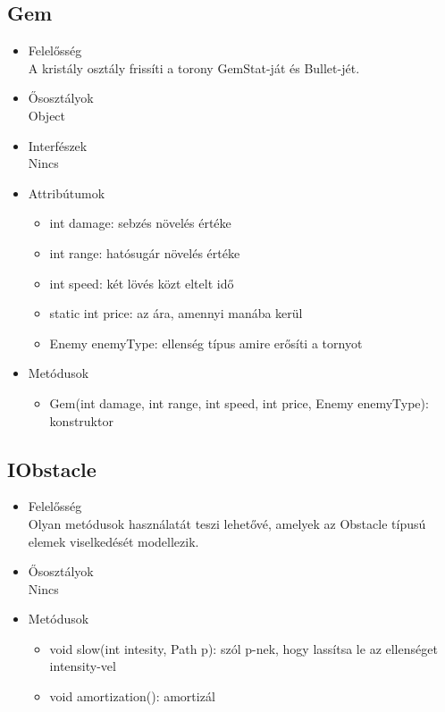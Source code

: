 \subsection{Gem}
\begin{itemize}
\item Felelősség\\
A kristály osztály frissíti a torony GemStat-ját és Bullet-jét.
\item Ősosztályok\\
Object
\item Interfészek\\
Nincs
\item Attribútumok\\
	\begin{itemize}
		\item int damage: sebzés növelés értéke
		\item int range: hatósugár növelés értéke
		\item int speed: két lövés közt eltelt idő
		\item static int price: az ára, amennyi manába kerül
		\item Enemy enemyType: ellenség típus amire erősíti a tornyot
	\end{itemize}
\item Metódusok\\
	\begin{itemize}
		
		\item Gem(int damage, int range, int speed, int price, Enemy enemyType): konstruktor
		
		
	\end{itemize}
\end{itemize}

\subsection{IObstacle}
\begin{itemize}
\item Felelősség\\
Olyan metódusok használatát teszi lehetővé, amelyek az Obstacle típusú elemek viselkedését modellezik.
\item Ősosztályok\\
Nincs

\item Metódusok\\
	\begin{itemize}
		\item void slow(int intesity, Path p): szól p-nek, hogy lassítsa le az ellenséget intensity-vel
		\item void amortization(): amortizál
		
		
	\end{itemize}
\end{itemize}
